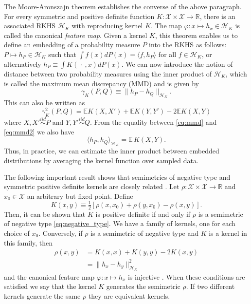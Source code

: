 \documentclass[aps,preprint,nofootinbib,floatfix]{revtex4-1}
\newcommand\E{\mathbb{E}}
\newcommand\kk{K}
\newcommand\kkk{h}
\newcommand\Hk{{\mathcal{H}}_{\kk}}
\begin{document}
The Moore-Aronszajn theorem 
\cite{Aronszajn}
establishes the converse of the above paragraph. 
For every symmetric
and positive definite function $\kk: \mathcal{X}\times \mathcal{X} \to
\mathbb{R}$, there is an associated RKHS $\Hk$ 
with reproducing
kernel $\kk$. The map $\varphi: x \mapsto \kkk_x \in \Hk$ is called
the canonical \emph{feature map}. Given a kernel $\kk$,
this theorem enables us to define an embedding of a probability measure
$P$ into the RKHS as follows: $P \mapsto \kkk_P \in
\Hk$ such that 
$\int f(x) d P(x) = \langle f, \kkk_P \rangle$ for all $f \in \Hk$,
or alternatively $\kkk_P \equiv \int \kk( \, \cdot \,, x)  d P(x)$. 
We can now  introduce the 
notion of distance between two probability measures using the inner product
of $\Hk$, which is called the maximum mean discrepancy (MMD) and
is given by
\begin{equation}
\label{eq:mmd}
\gamma_\kk(P,Q) \equiv \| \kkk_P - \kkk_Q \|_{\Hk}.
\end{equation}
This can also be written as \cite{Gretton2012}
\begin{equation}\label{eq:mmd2}
\gamma_\kk^2(P,Q) = \E \kk(X,X') + \E \kk(Y,Y') - 2 \E \kk(X, Y)
\end{equation}
where $X,X' \stackrel{iid}{\sim} P$ and $Y,Y'\stackrel{iid}{\sim} Q$.
From the equality between \eqref{eq:mmd} and \eqref{eq:mmd2} we also
have 
\begin{equation}\label{eq:inner_data}
\langle \kkk_P, \kkk_Q \rangle_{\Hk} = \E \, \kk(X, Y).
\end{equation}
Thus, in practice, we can estimate the inner product between  
embedded distributions 
by averaging the kernel function over sampled data.

The following important result shows that semimetrics of negative
type and symmetric positive definite kernels are closely related
\cite{Berg1984}. Let $\rho: \mathcal{X} \times \mathcal{X} \to \mathbb{R}$
and $x_0 \in \mathcal{X}$ an arbitrary but fixed point.
Define
\begin{equation}
\label{eq:kernel_semimetric}
\kk(x,y) \equiv 
\tfrac{1}{2} \left[  \rho(x,x_0) + \rho(y,x_0) - \rho(x,y)\right].
\end{equation}
Then, it can be shown that 
$\kk$ is positive definite if and only if $\rho$ is a semimetric
of negative type
\eqref{eq:negative_type}.
We have a family of kernels, one for each choice of $x_0$. Conversely,
if $\rho$ is a semimetric of negative type and $\kk$ is a kernel in this
family, then 
\begin{equation}
\label{eq:gen_kernel}
\begin{split}
\rho(x,y) &= \kk(x,x) + \kk(y,y) -2\kk(x,y) \\
&=  \| \kkk_x - \kkk_y \|^2_{\Hk}
\end{split}
\end{equation}
and the canonical feature map 
$\varphi: x \mapsto \kkk_x$ is injective \cite{Sejdinovic2013}.
When these conditions are satisfied we say that the kernel $\kk$ 
generates the semimetric $\rho$. 
If two different kernels generate the same $\rho$ they are
equivalent kernels.
\end{document}
